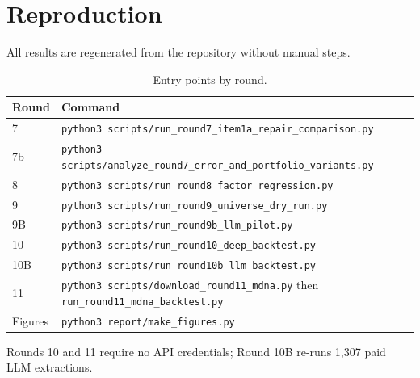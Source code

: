\documentclass[11pt]{article}
\newcommand{\sig}[1]{\texttt{#1}}
\begin{document}
\appendix
\section{Reproduction}

All results are regenerated from the repository without manual steps.

\begin{table}[H]
\centering\small
\caption{Entry points by round.}
\begin{tabular}{l l}
\toprule
\textbf{Round} & \textbf{Command} \\
\midrule
7      & \sig{python3 scripts/run\_round7\_item1a\_repair\_comparison.py} \\
7b     & \sig{python3 scripts/analyze\_round7\_error\_and\_portfolio\_variants.py} \\
8      & \sig{python3 scripts/run\_round8\_factor\_regression.py} \\
9      & \sig{python3 scripts/run\_round9\_universe\_dry\_run.py} \\
9B     & \sig{python3 scripts/run\_round9b\_llm\_pilot.py} \\
10     & \sig{python3 scripts/run\_round10\_deep\_backtest.py} \\
10B    & \sig{python3 scripts/run\_round10b\_llm\_backtest.py} \\
11     & \sig{python3 scripts/download\_round11\_mdna.py} then \sig{run\_round11\_mdna\_backtest.py} \\
Figures& \sig{python3 report/make\_figures.py} \\
\bottomrule
\end{tabular}
\end{table}

Rounds 10 and 11 require no API credentials; Round 10B re-runs 1,307 paid LLM extractions.
\end{document}
